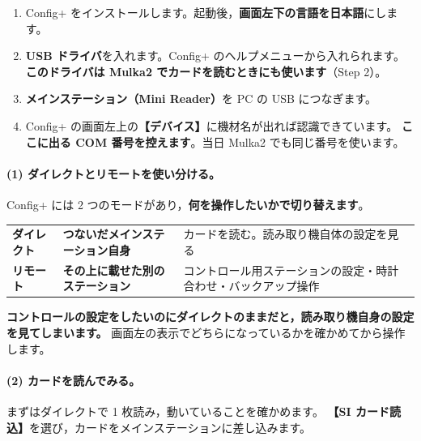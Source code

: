 \begin{enumerate}
\item Config+ をインストールします。起動後，\textbf{画面左下の言語を日本語}にします。
\item \textbf{USB ドライバ}を入れます。Config+ のヘルプメニューから入れられます。
      \textbf{このドライバは Mulka2 でカードを読むときにも使います}（Step 2）。
\item \textbf{メインステーション（Mini Reader）}を PC の USB につなぎます。
\item Config+ の画面左上の\textbf{【デバイス】}に機材名が出れば認識できています。
      \textbf{ここに出る COM 番号を控えます}。当日 Mulka2 でも同じ番号を使います。
\end{enumerate}

\paragraph{(1) ダイレクトとリモートを使い分ける。}
Config+ には 2 つのモードがあり，\textbf{何を操作したいかで切り替えます}。

\begin{center}
\small
\begin{tabular}{@{}P{22mm}P{50mm}P{68mm}@{}}
\toprule
{} &  &  \\
\midrule
\textbf{ダイレクト} & \textbf{つないだメインステーション自身}
  & カードを読む。読み取り機自体の設定を見る \\
\textbf{リモート} & \textbf{その上に載せた別のステーション}
  & コントロール用ステーションの設定・時計合わせ・バックアップ操作 \\
\bottomrule
\end{tabular}
\end{center}

\textbf{コントロールの設定をしたいのにダイレクトのままだと，読み取り機自身の設定を見てしまいます。}
画面左の表示でどちらになっているかを確かめてから操作します。

\paragraph{(2) カードを読んでみる。}
まずはダイレクトで 1 枚読み，動いていることを確かめます。
\textbf{【SI カード読込】}を選び，カードをメインステーションに差し込みます。


